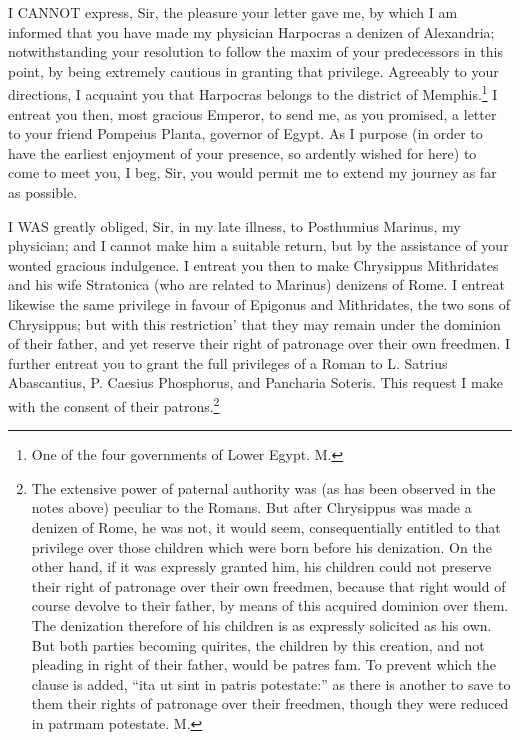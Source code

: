 
I CANNOT express, Sir, the pleasure your letter gave me, by which I am
informed that you have made my physician Harpocras a denizen of
Alexandria; notwithstanding your resolution to follow the maxim of your
predecessors in this point, by being extremely cautious in granting that
privilege. Agreeably to your directions, I acquaint you that Harpocras
belongs to the district of Memphis.\footnote{One of the four
governments of Lower Egypt. M.} I entreat you
then, most gracious Emperor, to send me, as you promised, a letter to your
friend Pompeius Planta, governor of Egypt. As I purpose (in order to have
the earliest enjoyment of your presence, so ardently wished for here) to
come to meet you, I beg, Sir, you would permit me to extend my journey as
far as possible.


I WAS greatly obliged, Sir, in my late illness, to Posthumius Marinus, my
physician; and I cannot make him a suitable return, but by the assistance
of your wonted gracious indulgence. I entreat you then to make Chrysippus
Mithridates and his wife Stratonica (who are related to Marinus) denizens
of Rome. I entreat likewise the same privilege in favour of Epigonus and
Mithridates, the two sons of Chrysippus; but with this restriction' that
they may remain under the dominion of their father, and yet reserve their
right of patronage over their own freedmen. I further entreat you to grant
the full privileges of a Roman to L. Satrius Abascantius, P. Caesius
Phosphorus, and Pancharia Soteris. This request I make with the consent of
their patrons.\footnote{The extensive power
of paternal authority was (as has been observed in the notes above)
peculiar to the Romans. But after Chrysippus was made a denizen of Rome,
he was not, it would seem, consequentially entitled to that privilege over
those children which were born before his denization. On the other hand,
if it was expressly granted him, his children could not preserve their
right of patronage over their own freedmen, because that right would of
course devolve to their father, by means of this acquired dominion over
them. The denization therefore of his children is as expressly solicited
as his own. But both parties becoming quirites, the children by this
creation, and not pleading in right of their father, would be patres fam.
To prevent which the clause is added, ``ita ut sint in patris potestate:''
as there is another to save to them their rights of patronage over their
freedmen, though they were reduced in patrmam potestate. M.}

